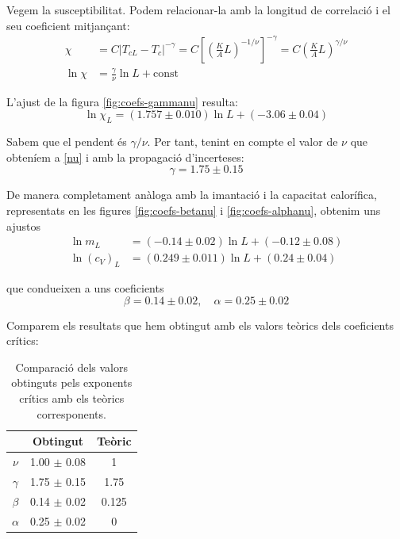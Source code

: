 \documentclass[a4paper]{article}
\begin{document}
Vegem la susceptibilitat. Podem relacionar-la amb la longitud de correlació i el seu coeficient mitjançant:
\begin{align*}
	\chi &= C \left|T_{cL}-T_c\right|^{-\gamma} = C \left[ \left(\frac{K}{A} L \right)^{-1/\nu} \right]^{-\gamma} = C \left(\frac{K}{A} L \right)^{\gamma/\nu} \\
	\ln \chi &= \frac{\gamma}{\nu} \ln L + \text{const}
\end{align*}

L'ajust de la figura \ref{fig:coefs-gammanu} resulta:
\begin{equation*}
	\ln \chi_L = (1.757 \pm 0.010) \ln L + (-3.06 \pm 0.04)
\end{equation*}

Sabem que el pendent és $\gamma/\nu$. Per tant, tenint en compte el valor de $\nu$ que obteníem a \eqref{nu} i amb la propagació d'incerteses:
\begin{equation*}
	\gamma = 1.75 \pm 0.15
\end{equation*}

De manera completament anàloga amb la imantació i la capacitat calorífica, representats en les figures \ref{fig:coefs-betanu} i \ref{fig:coefs-alphanu}, obtenim uns ajustos
\begin{align*}
	\ln m_L &= (-0.14 \pm 0.02) \ln L + (-0.12 \pm 0.08) \\
	\ln ({c_V})_L &= (0.249 \pm 0.011) \ln L + (0.24 \pm 0.04)
\end{align*}

que condueixen a uns coeficients
\begin{equation*}
	\beta = 0.14 \pm 0.02, \quad \alpha = 0.25 \pm 0.02
\end{equation*}

Comparem els resultats que hem obtingut amb els valors teòrics dels coeficients crítics:
\begin{table}[H]
\centering
\begin{tabular}{ccc}
\hline
\textbf{} & \textbf{Obtingut} & \textbf{Teòric} \\ \hline
$\nu$ & 1.00 $\pm$ 0.08 & 1 \\
$\gamma$ & 1.75 $\pm$ 0.15 & 1.75 \\
$\beta$ & 0.14 $\pm$ 0.02 & 0.125 \\
$\alpha$ & 0.25 $\pm$ 0.02 & 0
\end{tabular}
\caption{Comparació dels valors obtinguts pels exponents crítics amb els teòrics corresponents.}
\label{tab:critexp}
\end{table}
\end{document}
